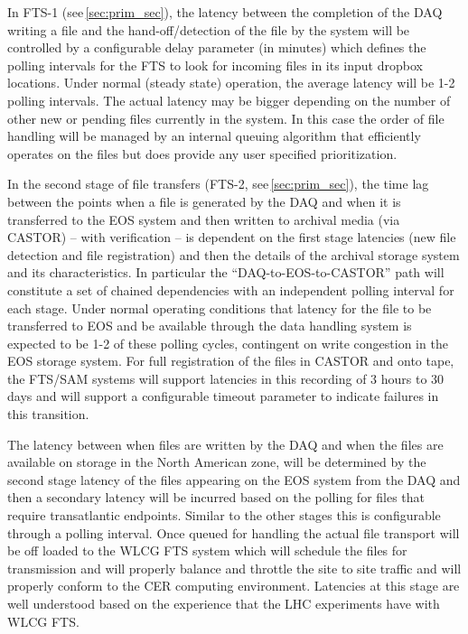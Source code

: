 \documentclass[pdftex,12pt,letter]{article}
\begin{document}
In FTS-1 (see\,\ref{sec:prim_sec}), the latency between the completion of the DAQ writing a file and the hand-off/detection of the file by the
system will be controlled by a configurable delay parameter (in minutes) which defines the polling intervals for the FTS
to look for  incoming files in its input dropbox locations.  Under normal (steady state) operation, the average latency will be 1-2 polling intervals.
The actual latency may be bigger depending on the number of other new or pending files currently in the system.
In this case the order of file handling will be managed by an internal queuing algorithm that efficiently operates on the files but
does provide any user specified prioritization.

In the second stage of file transfers (FTS-2, see\,\ref{sec:prim_sec}), the time lag between the points when a file is generated by the DAQ
and when it is transferred to the EOS
system and then written to archival media (via CASTOR) -- with verification --  is dependent on the first stage latencies (new file detection and file registration)
and then the details of the archival storage system and its characteristics.  In particular the ``DAQ-to-EOS-to-CASTOR'' path will constitute a set
of chained dependencies with an independent polling interval for each stage.  Under normal operating conditions that latency for the file to
be transferred to EOS and be available through the data handling system is expected to be 1-2 of these polling cycles, contingent on write
congestion in the EOS storage system.   For full registration of the files in CASTOR and onto tape, the FTS/SAM systems will support latencies
in this recording of 3 hours to 30 days and will support a configurable timeout parameter to indicate failures in this transition.

The latency between when files are written by the DAQ and when the files are available on storage in the North American zone,
will be determined by the second stage latency of the files appearing on the EOS system from the DAQ and then a secondary latency
will be incurred based on the polling for files that require transatlantic endpoints.  Similar to the other stages this is configurable
through a polling interval.  Once queued for handling the actual file transport will be off loaded to the WLCG FTS system which will
schedule the files for transmission and will properly balance and throttle the site to site traffic and will properly conform to the CER
 computing environment.  Latencies at this stage are well understood based on the experience that the LHC experiments have with WLCG FTS.  
\end{document}
